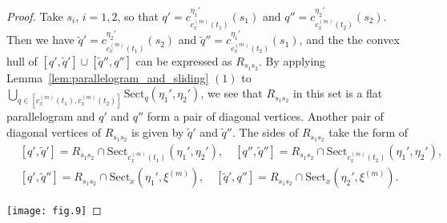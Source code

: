 \documentclass[12pt]{amsart}
\numberwithin{equation}{section}
\theoremstyle{plain}
\theoremstyle{definition}
\theoremstyle{remark}
\newcommand{\xxi}[1]{\xi^{(#1)}}
\newcommand{\cc}[2]{c_{#1}^{#2}}
\newcommand{\sect}[3][]{\mathrm{Sect}_{#1}(#2,#3)}
\begin{document}
\begin{proof}
 Take $s_i$, $i=1,2$, so that 
  $q'=\cc{\cc{x}{(m)}(t_1)}{\eta_1'}(s_1)$ and 
 $q''=\cc{\cc{x}{(m)}(t_2)}{\eta_2'}(s_2)$. 
 Then we have $\tilde q' = \cc{\cc{x}{(m)}(t_1)}{\eta_2'}(s_2)$ 
 and $\tilde q'' = \cc{\cc{x}{(m)}(t_2)}{\eta_1'}(s_1)$, and the 
 the convex hull of $[q',\tilde q'] \cup [\tilde q'', q'']$ can be
 expressed as $R_{s_1s_2}$.
 By applying Lemma~\ref{lem:parallelogram_and_sliding} $(1)$ to
 $\bigcup_{q \in [\cc{x}{(m)}(t_1),\cc{x}{(m)}(t_2)]}
 \sect[q]{\eta_1'}{\eta_2'}$, 
 we see that $R_{s_1s_2}$ in this set is a flat
 parallelogram and $q'$ and $q''$ form a pair of diagonal
 vertices. 
 Another pair of diagonal vertices of $R_{s_1s_2}$ is given by 
 $\tilde q'$ and $\tilde q''$.
 The sides of $R_{s_1s_2}$ take the form of
\begin{equation*}
\begin{split}
 & [q',\tilde q']=R_{s_1s_2} \cap
  \sect[\cc{x}{(m)}(t_1)]{\eta_1'}{\eta_2'}, \quad 
   [q'',\tilde q'']=R_{s_1s_2} \cap
  \sect[\cc{x}{(m)}(t_2)]{\eta_1'}{\eta_2'}, \\
 & [q',\tilde q'']=R_{s_1s_2}\cap\sect[x]{\eta_1'}{\xxi{m}},\quad  
   [\tilde q',q'']=R_{s_1s_2}\cap\sect[x]{\eta_2'}{\xxi{m}}. 
\end{split}
\end{equation*}

\vspace{-1.5cm}
\hspace{3.5cm}
\texttt{[image: fig.9]}
\vspace{1.5cm}


\end{proof}
\end{document}
